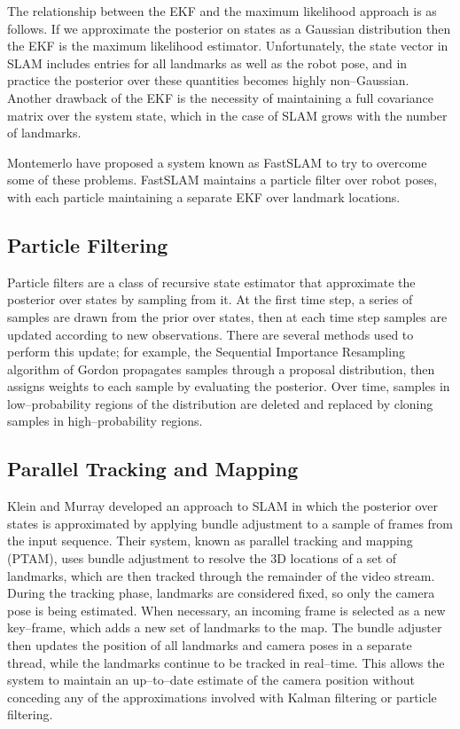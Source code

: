 The relationship between the EKF and the maximum likelihood approach
is as follows. If we approximate the posterior on states as a Gaussian
distribution then the EKF is the maximum likelihood
estimator. Unfortunately, the state vector in SLAM includes entries
for all landmarks as well as the robot pose, and in practice the
posterior over these quantities becomes highly non--Gaussian. Another
drawback of the EKF is the necessity of maintaining a full covariance
matrix over the system state, which in the case of SLAM grows with the
number of landmarks.

Montemerlo \etal \cite{Montemerlo02} have proposed a system known as
FastSLAM to try to overcome some of these problems. FastSLAM maintains
a particle filter over robot poses, with each particle maintaining a
separate EKF over landmark locations.

\subsection{Particle Filtering}
Particle filters are a class of recursive state estimator that
approximate the posterior over states by sampling from it. At the
first time step, a series of samples are drawn from the prior over
states, then at each time step samples are updated according to new
observations. There are several methods used to perform this update;
for example, the Sequential Importance Resampling algorithm of Gordon
\etal \cite{Gordon} propagates samples through a proposal
distribution, then assigns weights to each sample by evaluating the
posterior. Over time, samples in low--probability regions of the
distribution are deleted and replaced by cloning samples in
high--probability regions.

\subsection{Parallel Tracking and Mapping}
Klein and Murray \cite{Klein07} developed an approach to SLAM in which
the posterior over states is approximated by applying bundle
adjustment to a sample of frames from the input sequence. Their
system, known as parallel tracking and mapping (PTAM), uses bundle
adjustment to resolve the 3D locations of a set of landmarks, which
are then tracked through the remainder of the video stream. During the
tracking phase, landmarks are considered fixed, so only the camera
pose is being estimated. When necessary, an incoming frame is selected
as a new key--frame, which adds a new set of landmarks to the map. The
bundle adjuster then updates the position of all landmarks and camera
poses in a separate thread, while the landmarks continue to be tracked
in real--time. This allows the system to maintain an up--to--date
estimate of the camera position without conceding any of the
approximations involved with Kalman filtering or particle filtering.

